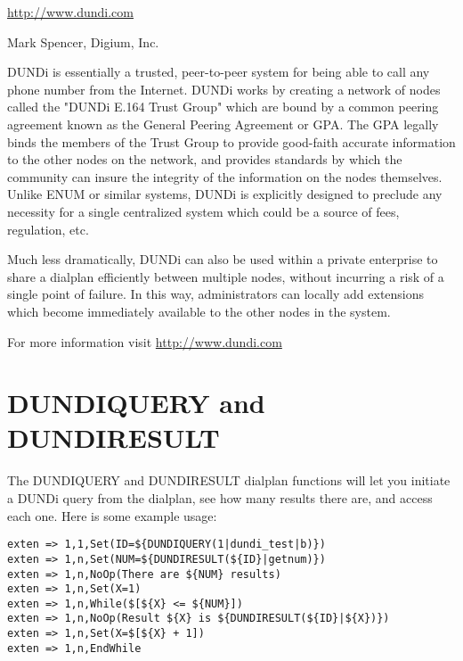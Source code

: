 \url{http://www.dundi.com}

Mark Spencer, Digium, Inc.

DUNDi is essentially a trusted, peer-to-peer system for being able to
call any phone number from the Internet.  DUNDi works by creating a
network of nodes called the "DUNDi E.164 Trust Group" which are bound by
a common peering agreement known as the General Peering Agreement or
GPA.  The GPA legally binds the members of the Trust Group to provide
good-faith accurate information to the other nodes on the network, and
provides standards by which the community can insure the integrity of
the information on the nodes themselves.  Unlike ENUM or similar
systems, DUNDi is explicitly designed to preclude any necessity for a
single centralized system which could be a source of fees, regulation,
etc.

Much less dramatically, DUNDi can also be used within a private
enterprise to share a dialplan efficiently between multiple nodes,
without incurring a risk of a single point of failure.  In this way,
administrators can locally add extensions which become immediately
available to the other nodes in the system.

For more information visit \url{http://www.dundi.com}

\section{DUNDIQUERY and DUNDIRESULT}

The DUNDIQUERY and DUNDIRESULT dialplan functions will let you initiate
a DUNDi query from the dialplan, see how many results there are, and access
each one.  Here is some example usage:

\begin{verbatim}
exten => 1,1,Set(ID=${DUNDIQUERY(1|dundi_test|b)})
exten => 1,n,Set(NUM=${DUNDIRESULT(${ID}|getnum)})
exten => 1,n,NoOp(There are ${NUM} results)
exten => 1,n,Set(X=1) 
exten => 1,n,While($[${X} <= ${NUM}])
exten => 1,n,NoOp(Result ${X} is ${DUNDIRESULT(${ID}|${X})}) 
exten => 1,n,Set(X=$[${X} + 1])
exten => 1,n,EndWhile
\end{verbatim}

